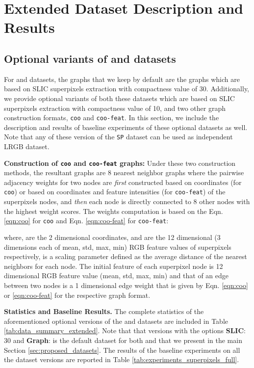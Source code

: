 \documentclass{article}
\begin{document}
\section{Extended Dataset Description and Results}\label{app:dataset_details}
\setcounter{figure}{0}
\setcounter{table}{0}



\subsection{Optional variants of \pascal and \coco datasets}
For \pascal and \coco datasets, the graphs that we keep by default are the \rbgraph graphs which are based on SLIC superpixels extraction with compactness value of 30. Additionally, we provide optional variants of both these datasets which are based on SLIC superpixels extraction with compactness value of 10, and two other graph construction formats, \texttt{coo} and \texttt{coo-feat}.
In this section, we include the description and results of baseline experiments of these optional datasets as well. Note that any of these version of the \texttt{SP} dataset can be used as independent LRGB dataset.

\textbf{Construction of \texttt{coo} and \texttt{coo-feat} graphs:}
Under these two construction methods, the resultant graphs are 8 nearest neighbor graphs where the pairwise adjacency weights for two nodes are \textit{first} constructed based on coordinates (for \texttt{coo}) or based on coordinates and feature intensities (for \texttt{coo-feat}) of the superpixels nodes, and \textit{then} each node is directly connected to 8 other nodes with the highest weight scores. The weights computation is based on the Eqn. \ref{eqn:coo} for \texttt{coo} and Eqn. \ref{eqn:coo-feat} for \texttt{coo-feat}:





    where,  are the 2 dimensional coordinates, and  are the 12 dimensional (3 dimensions each of mean, std, max, min) RGB feature values of superpixels  respectively,  is a scaling parameter defined as the average distance  of the  nearest neighbors for each node.
The initial feature of each superpixel node is 12 dimensional RGB feature value (mean, std, max, min) and that of an edge between two nodes is a 1 dimensional edge weight that is given by Eqn. \ref{eqn:coo} or \ref{eqn:coo-feat} for the respective graph format.

\textbf{Statistics and Baseline Results.} The complete statistics of the aforementioned optional versions of the \pascal and \coco datasets are included in Table \ref{tab:data_summary_extended}. Note that that versions with the options \textbf{SLIC}: 30 and \textbf{Graph}: \rbgraph is the default dataset for both \pascal and \coco that we present in the main Section \ref{sec:proposed_datasets}. The results of the baseline experiments on all the dataset versions are reported in Table \ref{tab:experiments_superpixels_full}.
\end{document}
